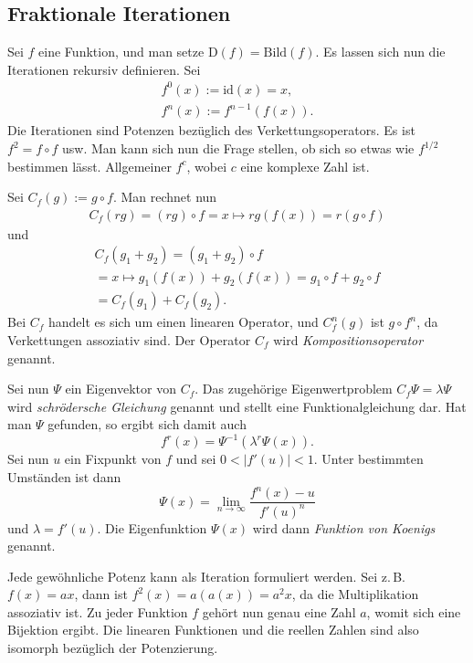 \documentclass[a4paper,10pt,fleqn,twocolumn,twoside]{article}
\numberwithin{equation}{section}
\begin{document}
\subsection{Fraktionale Iterationen}

Sei $f$ eine Funktion, und man setze
$\mathrm{D}(f)=\mathrm{Bild}(f)$. Es lassen sich nun die
Iterationen rekursiv definieren. Sei
\begin{gather*}
f^0(x) := \mathrm{id}(x) = x,\\
f^n(x) := f^{n-1}(f(x)).
\end{gather*}
Die Iterationen sind Potenzen bezüglich des Verkettungsoperators.
Es ist $f^2=f\circ f$ usw. Man kann sich nun die Frage stellen,
ob sich so etwas wie $f^{1/2}$ bestimmen lässt. Allgemeiner $f^c$,
wobei $c$ eine komplexe Zahl ist.

Sei $C_f(g) := g\circ f$. Man rechnet nun
\begin{gather*}
C_f(rg) = (rg)\circ f = x\mapsto rg(f(x)) = r(g\circ f)
\end{gather*}
und
\begin{gather*}
C_f(g_1+g_2) = (g_1+g_2)\circ f\\
= x\mapsto g_1(f(x))+g_2(f(x))
= g_1\circ f+g_2\circ f
\\= C_f(g_1)+C_f(g_2).
\end{gather*}
Bei $C_f$ handelt es sich um einen linearen Operator, und
$C_f^n(g)$ ist $g\circ f^n$, da Verkettungen assoziativ sind.
Der Operator $C_f$ wird \textit{Kompositionsoperator} genannt.

Sei nun $\Psi$ ein Eigenvektor von $C_f$. Das zugehörige
Eigenwertproblem $C_f\Psi = \lambda\Psi$ wird
\textit{schrödersche Gleichung}
genannt und stellt eine Funktionalgleichung dar. Hat man $\Psi$
gefunden, so ergibt sich damit auch
\begin{equation}
f^r(x) = \Psi^{-1}(\lambda^r\Psi(x)).
\end{equation}
Sei nun $u$ ein Fixpunkt von $f$ und sei $0<|f'(u)|<1$.
Unter bestimmten Umständen ist dann
\begin{equation}
\Psi(x) = \lim_{n\rightarrow\infty}\frac{f^n(x)-u}{f'(u)^n}
\end{equation}
und $\lambda=f'(u)$. Die Eigenfunktion $\Psi(x)$ wird
dann \textit{Funktion von Koenigs} genannt.

Jede gewöhnliche Potenz kann als Iteration formuliert werden.
Sei z.\,B. $f(x)=ax$, dann ist $f^2(x)=a(a(x))=a^2 x$, da die
Multiplikation assoziativ ist. Zu jeder Funktion $f$ gehört nun
genau eine Zahl $a$, womit sich eine Bijektion ergibt. Die
linearen Funktionen und die reellen Zahlen sind also isomorph
bezüglich der {\glqq}Potenzierung{\grqq}.
\end{document}
